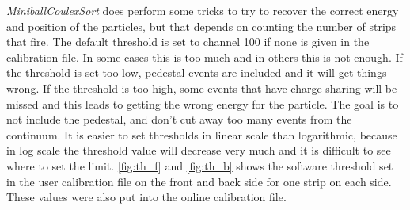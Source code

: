 \documentclass[twoside,english]{uiofysmaster/uiofysmaster}
\let\orgautoref\autoref
\renewcommand{\autoref}
        {%
		 \def\sectionautorefname{Section}%
		 \def\subsectionautorefname{Section}%
		 \def\subsubsectionautorefname{Section}%
		 \def\chapterautorefname{Chapter}%
          \orgautoref}
\begin{document}

\textsl{MiniballCoulexSort} does perform some tricks to try to recover the correct energy and position of the particles, but that depends on counting the number of strips that fire. 
The default threshold is set to channel 100 if none is given in the calibration file.
In some cases this is too much and in others this is not enough. 
If the threshold is set too low, pedestal events are included and it will get things wrong. 
If the threshold is too high, some events that have charge sharing will be missed and this leads to getting the wrong energy for the particle.
The goal is to not include the pedestal, and don't cut away too many events from the continuum.
It is easier to set thresholds in linear scale than logarithmic, because in log scale the threshold value will decrease very much and it is difficult to see where to set the limit. 
\autoref{fig:th_f} and \autoref{fig:th_b} shows the software threshold set in the user calibration file on the front and back side for one strip on each side.
These values were also put into the online calibration file.



\end{document}
